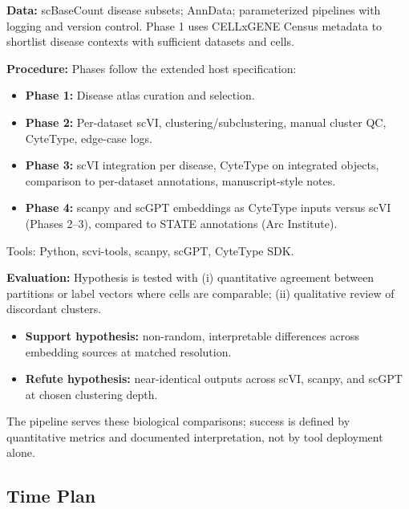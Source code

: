 \documentclass[12pt,a4paper]{article}
\begin{document}
\textbf{Data:} scBaseCount disease subsets; AnnData; parameterized pipelines with logging and version control. Phase 1 uses CELLxGENE Census metadata to shortlist disease contexts with sufficient datasets and cells.

\textbf{Procedure:} Phases follow the extended host specification:
\begin{itemize}
    \item \textbf{Phase 1:} Disease atlas curation and selection.
    \item \textbf{Phase 2:} Per-dataset scVI, clustering/subclustering, manual cluster QC, CyteType, edge-case logs.
    \item \textbf{Phase 3:} scVI integration per disease, CyteType on integrated objects, comparison to per-dataset annotations, manuscript-style notes.
    \item \textbf{Phase 4:} scanpy and scGPT embeddings as CyteType inputs versus scVI (Phases 2–3), compared to STATE annotations (Arc Institute).
\end{itemize}
Tools: Python, scvi-tools, scanpy, scGPT, CyteType SDK.

\textbf{Evaluation:} Hypothesis is tested with (i) quantitative agreement between partitions or label vectors where cells are comparable; (ii) qualitative review of discordant clusters.
\begin{itemize}
    \item \textbf{Support hypothesis:} non-random, interpretable differences across embedding sources at matched resolution.
    \item \textbf{Refute hypothesis:} near-identical outputs across scVI, scanpy, and scGPT at chosen clustering depth.
\end{itemize}
The pipeline serves these biological comparisons; success is defined by quantitative metrics and documented interpretation, not by tool deployment alone.

\subsection*{Time Plan}
\end{document}
